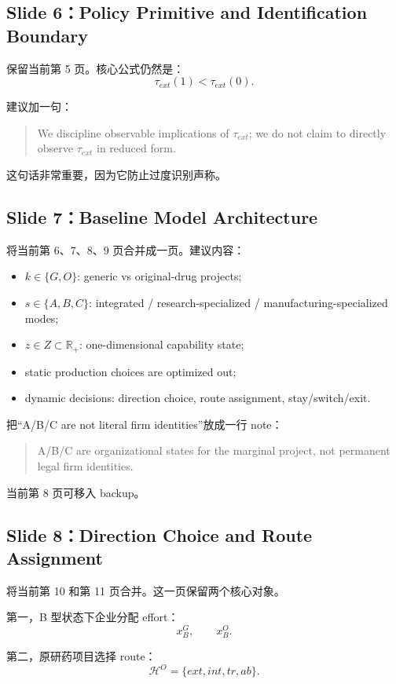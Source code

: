 \documentclass[12pt]{ctexart}
\begin{document}
\subsection{Slide 6：Policy Primitive and Identification Boundary}

保留当前第 5 页。核心公式仍然是：
\[
\tau_{ext}(1)<\tau_{ext}(0).
\]

建议加一句：
\begin{quote}
We discipline observable implications of $\tau_{ext}$; we do not claim to directly observe $\tau_{ext}$ in reduced form.
\end{quote}

这句话非常重要，因为它防止过度识别声称。

\subsection{Slide 7：Baseline Model Architecture}

将当前第 6、7、8、9 页合并成一页。建议内容：
\begin{itemize}
    \item $k\in\{G,O\}$: generic vs original-drug projects;
    \item $s\in\{A,B,C\}$: integrated / research-specialized / manufacturing-specialized modes;
    \item $z\in Z\subset\mathbb{R}_+$: one-dimensional capability state;
    \item static production choices are optimized out;
    \item dynamic decisions: direction choice, route assignment, stay/switch/exit.
\end{itemize}

把“A/B/C are not literal firm identities”放成一行 note：
\begin{quote}
A/B/C are organizational states for the marginal project, not permanent legal firm identities.
\end{quote}

当前第 8 页可移入 backup。

\subsection{Slide 8：Direction Choice and Route Assignment}

将当前第 10 和第 11 页合并。这一页保留两个核心对象。

第一，B 型状态下企业分配 effort：
\[
x_B^G,\qquad x_B^O.
\]

第二，原研药项目选择 route：
\[
\mathcal{H}^O=\{ext,int,tr,ab\}.
\]
\end{document}
